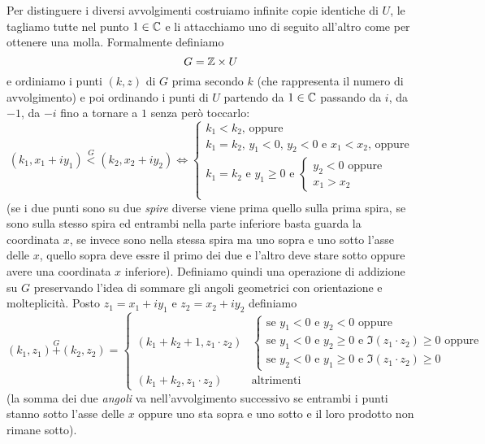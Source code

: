 Per distinguere i diversi avvolgimenti costruiamo infinite copie identiche di $U$,
le tagliamo tutte nel punto $1\in {\mathbb C}$ e li attacchiamo 
uno di seguito all'altro come per ottenere una molla.
Formalmente definiamo 
$$
  G = {\mathbb Z} \times U
$$
e ordiniamo i punti $(k,z)$ di $G$ prima secondo $k$ 
(che rappresenta il numero di avvolgimento) e poi ordinando i punti di $U$ 
partendo da $1\in {\mathbb C}$ passando da $i$, da $-1$, da $-i$ fino a tornare a $1$
senza però toccarlo:
\[
  (k_1, x_1+iy_1) \stackrel G< (k_2, x_2+iy_2) 
  \iff 
  \begin{cases}
    \text{$k_1 < k_2$, oppure} \\
    \text{$k_1=k_2$, $y_1<0$, $y_2<0$ e $x_1<x_2$, oppure} \\
    \text{$k_1 = k_2$ e $y_1\ge 0$ e }
    \begin{cases}
      y_2<0 \text{ oppure}\\
      x_1 > x_2
    \end{cases} \\
  \end{cases}
\]
(se i due punti sono su due \emph{spire} diverse viene prima quello 
sulla prima spira, se sono sulla stesso spira ed entrambi nella parte 
inferiore basta guarda la coordinata $x$, 
se invece sono nella stessa spira ma uno sopra e uno sotto l'asse delle $x$, 
quello sopra deve essre il primo dei due e l'altro deve stare sotto 
oppure avere una coordinata $x$ inferiore).
Definiamo quindi una operazione di addizione su $G$ preservando 
l'idea di sommare gli angoli geometrici con orientazione e 
molteplicità. 
Posto $z_1=x_1+iy_1$ e $z_2=x_2+iy_2$
definiamo
\begin{equation}\label{eq:somma_su_G}
(k_1,z_1) \stackrel G+ (k_2,z_2) 
= 
\begin{cases} 
  \scriptstyle(k_1+k_2+1, z_1\cdot z_2) & 
  \begin{cases}
    \text{se $y_1<0$ e $y_2<0$ oppure }\\
    \text{se $y_1<0$ e $y_2\ge 0$ e $\Im (z_1\cdot z_2)\ge 0$ oppure }\\
    \text{se $y_2<0$ e $y_1\ge 0$ e $\Im (z_1\cdot z_2)\ge 0$}
  \end{cases} \\
  \scriptstyle(k_1+k_2, z_1\cdot z_2) & \text{altrimenti}
\end{cases}
\end{equation}
(la somma dei due \emph{angoli} va nell'avvolgimento 
successivo se entrambi i punti stanno sotto l'asse delle $x$ oppure 
uno sta sopra e uno sotto e il loro prodotto non rimane sotto).

